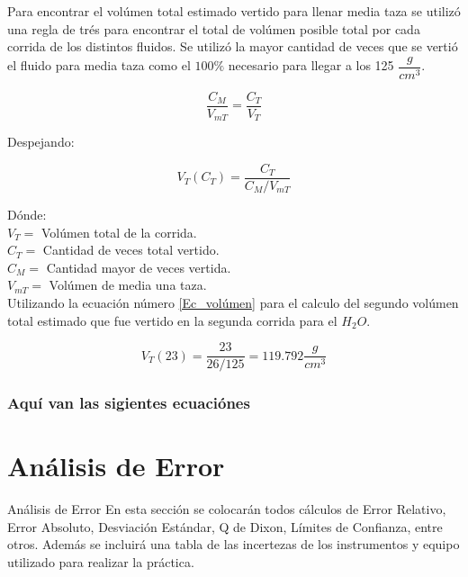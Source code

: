 \documentclass[osajnl,showpacs,superscriptaddress,10pt]{article}
\begin{document}
Para encontrar el volúmen total estimado vertido para llenar media taza se utilizó una regla de trés para encontrar el total de volúmen posible total por cada corrida de los distintos fluidos. Se utilizó la mayor cantidad de veces que se vertió el fluido para media taza como el $100 \%$ necesario para llegar a los 125 $\dfrac{g}{cm^{3}}$.



\[\frac{C_{M}}{V_{mT}} =  \frac{C_{T}}{V_{T}} \]


Despejando:


\begin{equation}
V_{T} (C_{T}) = \dfrac{C_{T}}{C_{M}/V_{mT}}
\label{Ec_volúmen}
\end{equation}


Dónde:\\
$V_{T} =$ Volúmen total de la corrida.\\
$C_{T} =$ Cantidad de veces total vertido.\\
$C_{M} =$ Cantidad mayor de veces vertida.\\
$V_{mT} =$ Volúmen de media una taza.\\



Utilizando la ecuación número \ref{Ec_volúmen} para el calculo del segundo volúmen total estimado que fue vertido en la segunda corrida para el $H_{2}O$.


\[V_{T} (23) = \dfrac{23}{26/125} = 119.792 \dfrac{g}{cm^{3}}\]

\clearpage


\subsubsection{Aquí van las sigientes ecuaciónes}






\section{Análisis de Error}

Análisis de Error En esta sección se colocarán todos cálculos de Error Relativo, Error Absoluto, Desviación Estándar, Q de Dixon, Límites de Confianza, entre otros. Además se incluirá una tabla de las incertezas de los instrumentos y equipo utilizado para realizar la práctica.\
\end{document}

